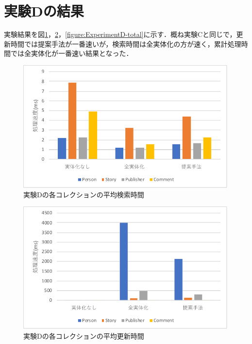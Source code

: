 \documentclass[a4paper,11pt]{ujreport}
\begin{document}
\section{実験Dの結果}
実験結果を図\ref{figure:ExperimentD-find}，\ref{figure:ExperimentD-update}，\ref{figure:ExperimentD-total}に示す．概ね実験Cと同じで，更新時間では提案手法が一番速いが，検索時間は全実体化の方が速く，累計処理時間では全実体化が一番速い結果となった．
\begin{figure}[htbp]
	\begin{center}
		\includegraphics[width=30em]{src/ExperimentD-find.pdf} %
	\end{center}
	\caption{実験Dの各コレクションの平均検索時間}
	\label{figure:ExperimentD-find}
\end{figure}
\begin{figure}[htbp]
	\begin{center}
		\includegraphics[width=30em]{src/ExperimentD-update.pdf} %
	\end{center}
	\caption{実験Dの各コレクションの平均更新時間}
	\label{figure:ExperimentD-update}
\end{figure}
\end{document}
